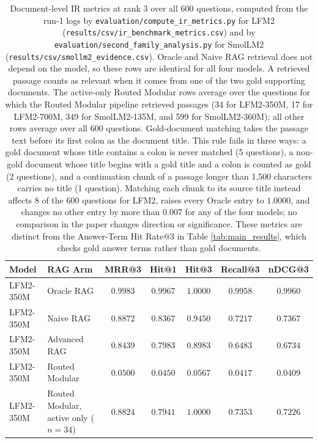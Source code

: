 \documentclass[10pt]{article}
\begin{document}
\begin{table}[t]
\centering
\caption{Document-level IR metrics at rank 3 over all 600 questions, computed from the run-1 logs by \texttt{evaluation/compute\_ir\_metrics.py} for LFM2 (\texttt{results/csv/ir\_benchmark\_metrics.csv}) and by \texttt{evaluation/second\_family\_analysis.py} for SmolLM2 (\texttt{results/csv/smollm2\_evidence.csv}). Oracle and Naive RAG retrieval does not depend on the model, so these rows are identical for all four models. A retrieved passage counts as relevant when it comes from one of the two gold supporting documents. The active-only Routed Modular rows average over the questions for which the Routed Modular pipeline retrieved passages (34 for LFM2-350M, 17 for LFM2-700M, 349 for SmolLM2-135M, and 599 for SmolLM2-360M); all other rows average over all 600 questions. Gold-document matching takes the passage text before its first colon as the document title. This rule fails in three ways: a gold document whose title contains a colon is never matched (5 questions), a non-gold document whose title begins with a gold title and a colon is counted as gold (2 questions), and a continuation chunk of a passage longer than 1,500 characters carries no title (1 question). Matching each chunk to its source title instead affects 8 of the 600 questions for LFM2, raises every Oracle entry to $1.0000$, and changes no other entry by more than $0.007$ for any of the four models; no comparison in the paper changes direction or significance. These metrics are distinct from the Answer-Term Hit Rate@3 in Table \ref{tab:main_results}, which checks gold answer terms rather than gold documents.}
\label{tab:ir_metrics}
\small
\setlength{\tabcolsep}{4pt}
\begin{tabular}{llccccc}
\toprule
\textbf{Model} & \textbf{RAG Arm} & \textbf{MRR@3} & \textbf{Hit@1} & \textbf{Hit@3} & \textbf{Recall@3} & \textbf{nDCG@3} \\
\midrule
LFM2-350M & Oracle RAG & $0.9983$ & $0.9967$ & $1.0000$ & $0.9958$ & $0.9960$ \\
LFM2-350M & Naive RAG & $0.8872$ & $0.8367$ & $0.9450$ & $0.7217$ & $0.7367$ \\
LFM2-350M & Advanced RAG & $0.8439$ & $0.7983$ & $0.8983$ & $0.6483$ & $0.6734$ \\
LFM2-350M & Routed Modular & $0.0500$ & $0.0450$ & $0.0567$ & $0.0417$ & $0.0409$ \\
LFM2-350M & Routed Modular, active only ($n=34$) & $0.8824$ & $0.7941$ & $1.0000$ & $0.7353$ & $0.7226$ \\

\end{tabular}
\end{table}
\end{document}
